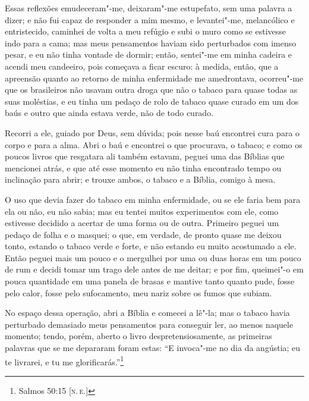 Essas reflexões emudeceram"-me, deixaram"-me estupefato, sem uma palavra a
dizer; e não fui capaz de responder a mim mesmo, e levantei"-me,
melancólico e entristecido, caminhei de volta a meu refúgio e subi o
muro como se estivesse indo para a cama; mas meus pensamentos haviam
sido perturbados com imenso pesar, e eu não tinha vontade de dormir;
então, sentei"-me em minha cadeira e acendi meu candeeiro, pois começava
a ficar escuro: à medida, então, que a apreensão quanto ao retorno de
minha enfermidade me amedrontava, ocorreu"-me que os brasileiros não
usavam outra droga que não o tabaco para quase todas as suas moléstias,
e eu tinha um pedaço de rolo de tabaco quase curado em um dos baús e
outro que ainda estava verde, não de todo curado.

Recorri a ele, guiado por Deus, sem dúvida; pois nesse baú encontrei
cura para o corpo e para a alma. Abri o baú e encontrei o que procurava,
o tabaco; e como os poucos livros que resgatara ali também estavam,
peguei uma das Bíblias que mencionei atrás, e que até esse momento eu
não tinha encontrado tempo ou inclinação para abrir; e trouxe ambos, o
tabaco e a Bíblia, comigo à mesa.

O uso que devia fazer do tabaco em minha enfermidade, ou se ele faria
bem para ela ou não, eu não sabia; mas eu tentei muitos experimentos com
ele, como estivesse decidido a acertar de uma forma ou de outra.
Primeiro peguei um pedaço de folha e o masquei; o que, em verdade, de
pronto quase me deixou tonto, estando o tabaco verde e forte, e não
estando eu muito acostumado a ele. Então peguei mais um pouco e o
mergulhei por uma ou duas horas em um pouco de rum e decidi tomar um
trago dele antes de me deitar; e por fim, queimei"-o em pouca quantidade
em uma panela de brasas e mantive tanto quanto pude, fosse pelo calor,
fosse pelo sufocamento, meu nariz sobre os fumos que subiam.

No espaço dessa operação, abri a Bíblia e comecei a lê"-la; mas o tabaco
havia perturbado demasiado meus pensamentos para conseguir ler, ao menos
naquele momento; tendo, porém, aberto o livro despretensiosamente, as
primeiras palavras que se me depararam foram estas: ``E invoca"-me no dia
da angústia; eu te livrarei, e tu me glorificarás.''\footnote{Salmos
  50:15 {[}\textsc{n.\,e.}{]}}

